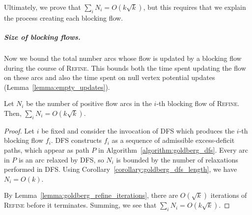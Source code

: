 \documentclass[a4paper,UKenglish]{socg-lipics-v2018}
\def\polylog{\mathop{\mathrm{polylog}}}
\theoremstyle{plain}
\numberwithin{figure}{section}
\renewcommand{\paragraph}{\subparagraph}
\begin{document}
Ultimately, we prove that $\sum_i N_i = O(k\sqrt{k})$, but this requires that
we explain the process creating each blocking flow.

\paragraph{Size of blocking flows.}

Now we bound the total number arcs whose flow is updated by a blocking flow during the course of \textsc{Refine}.
This bounds both the time spent updating the flow on these arcs and also the time spent on null vertex potential updates
(Lemma~\ref{lemma:empty_updates}).

\begin{lemmarep}
\label{lemma:goldberg_bf_size}
Let $N_i$ be the number of positive flow arcs in the $i$-th blocking flow
of \textsc{Refine}.
Then, $\sum_i N_i = O(k\sqrt{k})$.
\end{lemmarep}

\begin{proof}
Let $i$ be fixed and consider the invocation of \textsc{DFS} which produces the
$i$-th blocking flow $f_i$.
\textsc{DFS} constructs $f_i$ as a sequence of admissible excess-deficit paths,
which appear as path $P$ in Algorithm~\ref{algorithm:goldberg_dfs}.
Every arc in $P$ is an arc relaxed by \textsc{DFS}, so $N_i$ is bounded by the
number of relaxations performed in \textsc{DFS}.
Using Corollary~\ref{corollary:goldberg_dfs_length}, we have $N_i = O(k)$.

By Lemma~\ref{lemma:goldberg_refine_iterations}, there are $O(\sqrt{k})$
iterations of \textsc{Refine} before it terminates.
Summing, we see that $\sum_i N_i = O(k\sqrt{k})$.
\end{proof}

\end{document}
